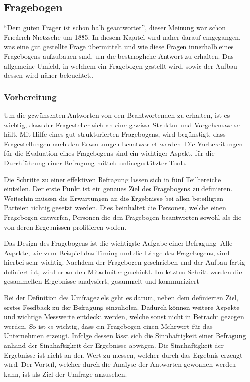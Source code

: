 \subsection{Fragebogen}
\label{acqusition}
\enquote{Dem guten Frager ist schon halb geantwortet}, dieser Meinung war schon Friedrich Nietzsche um 1885. 
In diesem Kapitel wird näher darauf eingegangen, was eine gut gestellte Frage übermittelt und wie diese Fragen innerhalb eines Fragebogens aufzubauen sind, um die bestmögliche Antwort zu erhalten.
Das allgemeine Umfeld, in welchem ein Fragebogen gestellt wird, sowie der Aufbau dessen wird näher beleuchtet.\autocite{Nietzsche}.

\subsubsection{Vorbereitung}
Um die gewünschten Antworten von den Beantwortenden zu erhalten, ist es wichtig, dass der Fragesteller sich an eine gewisse Struktur und Vorgehensweise hält.
Mit Hilfe eines gut strukturierten Fragebogens, wird begünstigt, dass Fragestellungen nach den Erwartungen beantwortet werden.
Die Vorbereitungen für die Evaluation eines Fragebogens sind ein wichtiger Aspekt, für die Durchführung einer Befragung mittels onlinegestützter Tools. 

Die Schritte zu einer effektiven Befragung lassen sich in fünf Teilbereiche einteilen. 
Der erste Punkt ist ein genaues Ziel des Fragebogens zu definieren. 
Weiterhin müssen die Erwartungen an die Ergebnisse bei allen beteiligten Parteien richtig gesetzt werden. 
Dies beinhaltet die Personen, welche einen Fragebogen entwerfen, Personen die den Fragebogen beantworten sowohl als die von deren Ergebnissen profitieren wollen.\autocite[Preparing for the Survey]{Perfect}

Das Design des Fragebogens ist die wichtigste Aufgabe einer Befragung. 
Alle Aspekte, wie zum Beispiel das Timing und die Länge des Fragebogens, sind hierbei sehr wichtig. 
Nachdem der Fragebogen geschrieben und der Aufbau fertig definiert ist, wird er an den Mitarbeiter geschickt.
Im letzten Schritt werden die gesammelten Ergebnisse analysiert, gesammelt und kommuniziert\autocite[Preparing for the Survey]{Perfect}.

Bei der Definition des Umfrageziels geht es darum, neben dem definierten Ziel, erstes Feedback zu der Befragung einzuholen. 
Dadurch können weitere Aspekte und wichtige Messwerte entdeckt werden, welche sonst nicht in Betracht gezogen werden.
So ist es wichtig, dass ein Fragebogen einen Mehrwert für das Unternehmen erzeugt. 
Infolge dessen lässt sich die Sinnhaftigkeit einer Befragung anhand der Sinnhaftigkeit der Ergebnisse abwägen. 
Die Sinnhaftigkeit der Ergebnisse ist nicht an den Wert zu messen, welcher durch das Ergebnis erzeugt wird. 
Der Vorteil, welcher durch die Analyse der Antworten gewonnen werden kann, ist als Ziel der Umfrage anzusehen\autocite[Defining Survey Goals]{Perfect}. 

